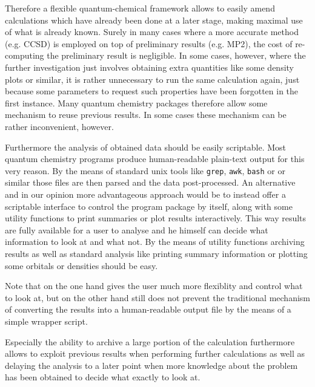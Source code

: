 Therefore a flexible quantum-chemical framework allows to
easily amend calculations which have already been done
at a later stage, making maximal use of what is already known.
Surely in many cases where a more accurate method (e.g. CCSD) is employed
on top of preliminary results (e.g. MP2),
the cost of re-computing the preliminary result is negligible.
In some cases, however,
where the further investigation just involves obtaining
extra quantities like some density plots or similar,
it is rather unnecessary to run the same calculation again,
just because some parameters to request such properties
have been forgotten in the first instance.
Many quantum chemistry packages therefore allow
some mechanism to reuse previous results.
In some cases these mechanism can be rather inconvenient, however.

Furthermore the analysis of obtained data should be easily scriptable.
Most quantum chemistry programs produce human-readable plain-text output
for this very reason.
By the means of standard unix tools like \texttt{grep}, \texttt{awk},
\texttt{bash} or \python or similar those files are then parsed and
the data post-processed.
An alternative and in our opinion more advantageous approach
would be to instead offer a scriptable interface to control
the program package by itself,
along with some utility functions to print summaries
or plot results interactively.
This way results are fully available for a user to analyse
and he himself can decide what information to look at
and what not.
By the means of utility functions
archiving results as well as standard analysis
like printing summary information or plotting some orbitals or densities
should be easy.

Note that on the one hand gives the user much more flexiblity and control
what to look at,
but on the other hand still does not prevent the traditional
mechanism of converting the results into a human-readable output file
by the means of a simple wrapper script.

Especially the ability to archive a large portion of the calculation
furthermore allows to exploit previous results when performing
further calculations as well as delaying the analysis
to a later point when \eg more knowledge about the
problem has been obtained to decide what exactly to look at.
